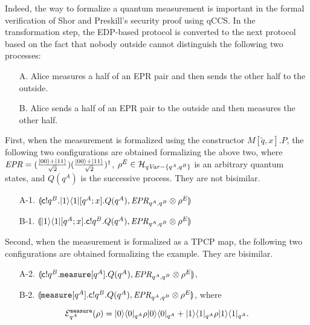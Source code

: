 Indeed, the way to formalize a quantum measurement is important in the
formal verification of Shor and Preskill's security proof using qCCS.
In the transformation step, the EDP-based protocol
is converted to the next protocol based on the
fact that nobody outside cannot distinguish the following 
two processes:
\begin{itemize}
 \item[A.] Alice measures a half of an EPR pair
       and then sends the other half to the outside.
 \item[B.] Alice sends a half of an EPR pair to the outside
       and then measures the other half.
\end{itemize}
First, when the measurement is formalized using the
constructor $M[\tilde q, x].P$, the following two configurations are
obtained formalizing the above two, where
$\mathit{EPR} =
(\frac{|00\rangle+|11\rangle}{\sqrt{2}})
(\frac{|00\rangle+|11\rangle}{\sqrt{2}})^\dagger$,
$\rho^E \in \mathcal{H}_{\mathit{qVar} - \{q^A,q^B\}}$
is an arbitrary quantum states, and $Q(q^A)$ is
the successive process. They are not bisimilar.
\begin{itemize}
 \item[A-1.] $\llparenthesis 
       \mathsf{c}! q^B. |1\rangle\langle 1|[q^A;x].Q(q^A)
       , \mathit{EPR}_{q^A, q^B} \otimes \rho^E \rrparenthesis$
 \item[B-1.] $\llparenthesis 
        |1\rangle\langle 1|[q^A;x]. \mathsf{c}! q^B.Q(q^A)
       , \mathit{EPR}_{q^A, q^B} \otimes \rho^E \rrparenthesis$
\end{itemize}
Second, when the measurement is formalized as 
a TPCP map, the following two configurations are obtained
formalizing the example. They are bisimilar.
\begin{itemize}
 \item[A-2.] $\llparenthesis 
       \mathsf{c}! q^B. {\tt measure}[q^A].Q(q^A)
       , 
       \mathit{EPR}_{q^A, q^B} \otimes \rho^E
        \rrparenthesis$,
 \item[B-2.] $\llparenthesis 
        {\tt measure}[q^A]. \mathsf{c}! q^B.Q(q^A)
       , 
       \mathit{EPR}_{q^A, q^B} \otimes \rho^E
        \rrparenthesis$, where
\end{itemize}
\[
\mathcal{E}^{\tt measure}_{q^A}(\rho) = 
|0\rangle\langle 0|_{q^A}\rho|0\rangle\langle 0|_{q^A} + |1\rangle\langle 1|_{q^A}
\rho |1\rangle\langle 1|_{q^A}.
\]

